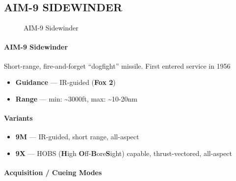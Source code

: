\subsection{AIM-9 SIDEWINDER}
\label{subsec:aim9}
\begin{figure}[htbp]
    \centering
    \caption{AIM-9 Sidewinder}
\end{figure}

\paragraph{AIM-9 Sidewinder}
Short-range, fire-and-forget ``dogfight'' missile. First entered service in 1956

\begin{itemize}
    \item \textbf{Guidance} --- IR-guided (\textbf{Fox 2})
    \item \textbf{Range} --- min: \textasciitilde3000ft, max: \textasciitilde10-20nm
\end{itemize}

\paragraph{Variants}
\begin{itemize}
    \item \textbf{9M} --- IR-guided, short range, all-aspect
    \item \textbf{9X} --- HOBS (\textbf{H}igh \textbf{O}ff-\textbf{B}ore\textbf{S}ight) capable, thrust-vectored, all-aspect
\end{itemize}

\paragraph{Acquisition / Cueing Modes}

